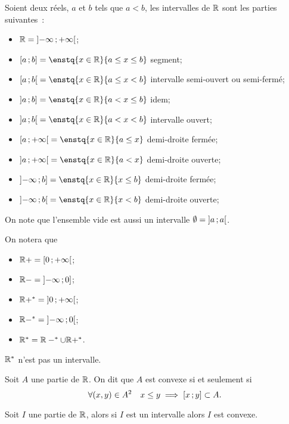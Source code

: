 \begin{defdef}
  Soient deux réels, $a$ et $b$ tels que $a<b$, les intervalles de $\mathbb{R}$ sont les parties suivantes~:
  \begin{itemize}
  \item $\mathbb{R}=\left] -\infty \, ;  +\infty \right[$;
  \item $\intervalleff{a}{b}=\enstq{x \in \R}{a\leq x \leq b}$ segment;
  \item $\intervallefo{a}{b}=\enstq{x \in \R}{a\leq x < b}$ intervalle semi-ouvert ou semi-fermé;
  \item $\intervalleof{a}{b}=\enstq{x \in \R}{a< x \leq b}$ idem;
  \item $\intervalleoo{a}{b}=\enstq{x \in \R}{a< x < b}$ intervalle ouvert;
  \item $\intervallefo{a}{+\infty}=\enstq{x \in \R}{a\leq x}$ demi-droite fermée;
  \item $\intervalleoo{a}{+\infty}=\enstq{x \in \R}{a< x}$ demi-droite ouverte;
  \item $\intervalleof{-\infty}{b}=\enstq{x \in \R}{x \leq b}$ demi-droite fermée;
  \item $\intervalleoo{-\infty}{b}=\enstq{x \in \R}{x <b}$ demi-droite ouverte;
  \end{itemize}
\end{defdef}
On note que l'ensemble vide est aussi un intervalle $\emptyset=\left] a \, ;  a \right[$.
\begin{defdef}
  On notera que
  \begin{itemize}
  \item $\mathbb{R}+=\left[ 0 \, ;  +\infty \right[$;
  \item $\mathbb{R}-=\left] -\infty \, ;  0 \right]$;
  \item $\mathbb{R}+^*=\left] 0 \, ;  +\infty \right[$;
  \item $\mathbb{R}-^*=\left] -\infty \, ;  0 \right[$;
  \item $\mathbb{R}^*=\mathbb{R}-^* \cup \mathbb{R}+^*$.
  \end{itemize}
  $\mathbb{R}^*$ n'est pas un intervalle.
\end{defdef}
\begin{defdef}
  Soit $A$ une partie de $\mathbb{R}$. On dit que $A$ est convexe si et seulement si
  \begin{equation}
    \forall (x,y) \in A^2 \quad x\leq y \implies \left[ x \, ;  y \right]\subset A.
  \end{equation}
\end{defdef}
\begin{theo}
  \label{theo:partieconvexe1}
  Soit $I$ une partie de $\mathbb{R}$, alors si $I$ est un intervalle alors $I$ est convexe.
\end{theo}
